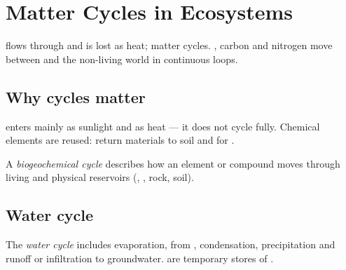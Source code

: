 \chapter{Matter Cycles in Ecosystems}\label{ch:g9:cycles}

 flows through  and is lost as heat; matter cycles.
, carbon and nitrogen move between  and the non-living
world in continuous loops.

\section{Why cycles matter}

\begin{proposition}\label{prop:g9:cycles:vs}
 enters mainly as sunlight and  as heat --- it does not cycle
fully. Chemical elements are reused:  return materials to soil
and  for .
\end{proposition}
\admitted

\begin{definition}\label{def:g9:cycles:bio}
A \emph{biogeochemical cycle} describes how an
element or compound moves through living  and physical
reservoirs (, , rock, soil).
\end{definition}


\section{Water cycle}

\begin{definition}\label{def:g9:cycles:water}
The \emph{water cycle} includes evaporation,
 from , condensation, precipitation and runoff or
infiltration to groundwater.  are temporary stores of .
\end{definition}

